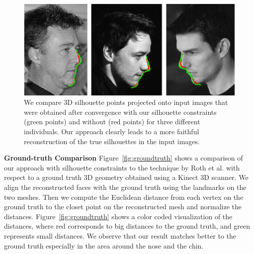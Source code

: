 \begin{figure}[t]
  \centering
  \includegraphics[width=1\linewidth]{figures/sil_all3.jpg}
  \caption{\label{fig:sil_all}
           We compare 3D silhouette points projected onto input images that were obtained after convergence with our silhouette constraints (green points) and without (red points) for three different individuals. Our approach clearly leads to a more faithful reconstruction of the true silhouettes in the input images.}
\end{figure}

\textbf{Ground-truth Comparison} Figure~\ref{fig:groundtruth} shows a comparison of our approach with silhouette constraints to the technique by Roth et al. \cite{Roth:2015:UFR} with respect to a ground truth 3D geometry obtained using a Kinect 3D scanner. We align the reconstructed faces with the ground truth using the landmarks on the two meshes. Then we compute the Euclidean distance from each vertex on the ground truth to the closet point on the reconstructed mesh and normalize the distances. Figure~\ref{fig:groundtruth} shows a color coded visualization of the distances, where red corresponds to big distances to the ground truth, and green represents small distances. We observe that our result matches better to the ground truth especially in the area around the nose and the chin. 

